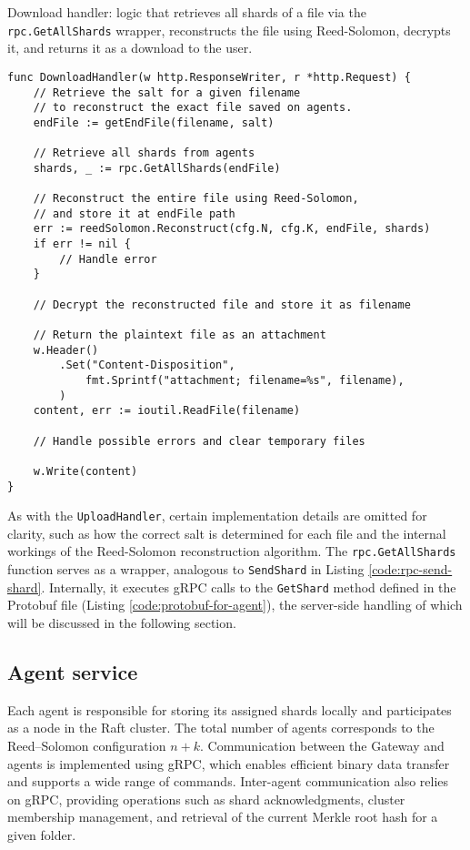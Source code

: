 \begin{listing}
\caption{Download handler: logic that retrieves all shards of a file via the \texttt{rpc.GetAllShards} wrapper, reconstructs the file using Reed-Solomon, decrypts it, and returns it as a download to the user.}
\label{code:download-handler}
\begin{verbatim}
func DownloadHandler(w http.ResponseWriter, r *http.Request) {
    // Retrieve the salt for a given filename 
    // to reconstruct the exact file saved on agents.
    endFile := getEndFile(filename, salt)

    // Retrieve all shards from agents
    shards, _ := rpc.GetAllShards(endFile)

    // Reconstruct the entire file using Reed-Solomon,
    // and store it at endFile path
    err := reedSolomon.Reconstruct(cfg.N, cfg.K, endFile, shards)
    if err != nil {
        // Handle error
    }

    // Decrypt the reconstructed file and store it as filename

    // Return the plaintext file as an attachment
    w.Header()
        .Set("Content-Disposition",
            fmt.Sprintf("attachment; filename=%s", filename),
        )
    content, err := ioutil.ReadFile(filename)

    // Handle possible errors and clear temporary files

    w.Write(content)
}
\end{verbatim}
\end{listing}

As with the \texttt{UploadHandler}, certain implementation details are omitted for clarity, such as how the correct salt is determined for each file and the internal workings of the Reed-Solomon reconstruction algorithm. The \texttt{rpc.GetAllShards} function serves as a wrapper, analogous to \texttt{SendShard} in Listing \ref{code:rpc-send-shard}. Internally, it executes gRPC calls to the \texttt{GetShard} method defined in the Protobuf file (Listing \ref{code:protobuf-for-agent}), the server-side handling of which will be discussed in the following section.

\newpage

\subsection{Agent service}

Each agent is responsible for storing its assigned shards locally and participates as a node in the Raft cluster. The total number of agents corresponds to the Reed–Solomon configuration $n+k$. Communication between the Gateway and agents is implemented using gRPC, which enables efficient binary data transfer and supports a wide range of commands. Inter-agent communication also relies on gRPC, providing operations such as shard acknowledgments, cluster membership management, and retrieval of the current Merkle root hash for a given folder.

